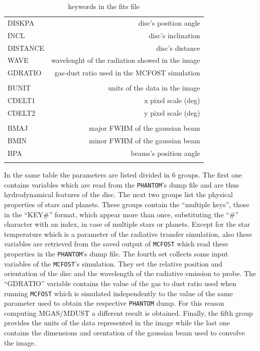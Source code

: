 \documentclass[a4paper,10pt]{report}
\begin{document}
\begin{table}
\begin{center}
\begin{tabular}{l r}
        DISKPA & disc's position angle\\
        INCL & disc's inclination\\
        DISTANCE & disc's distance \\
        WAVE & wavelenght of the radiation showed in the image\\
        GDRATIO & gas-dust ratio used in the MCFOST simulation \\ \\

        BUNIT & units of the data in the image \\ 
        CDELT1 & x pixel scale (deg) \\
        CDELT2 & y pixel scale (deg)\\ \\
        
        BMAJ & major FWHM of the gaussian beam \\
        BMIN & minor FWHM of the gaussian beam\\
        BPA & beams's position angle \\ \\
        

         \bottomrule
        \end{tabular}
        \end{center}

        \caption{keywords in the fits file}
\end{table}

In the same table the parameters are listed divided in 6 groups. The first one contains
variables which are read from the \lstinline{PHANTOM}'s dump file and are thus hydrodynamical features of
the disc. The next two groups list the physical properties of stars and planets. These groups contain the 
``multiple keys'', those in the ``KEY\#'' format, which appear more than once, substituting the ``\#'' character with an index,
in case of multiple stars or planets.
Except for the star temperature which is a parameter of the radiative transfer simulation, also these variables are retrieved from
the saved output of \lstinline{MCFOST} which read these properties in the \lstinline{PHANTOM}'s dump file.
The fourth set collects some input variables of the \lstinline{MCFOST}'s simulation.
They set the relative position and orientation of the disc and the wavelength of the radiative emission to probe.
The ``GDRATIO'' variable contains the value of the gas to dust ratio used when running \lstinline{MCFOST} which is simulated
independently to the value of the same parameter used to obtain the respective \lstinline{PHANTOM} dump. For
this reason computing MGAS/MDUST a different result is obtained.
Finally, the fifth group provides the units of the data represented in the image while the last one contains
the dimensions and orentation of the gaussian beam used to convolve the image.
\end{document}
